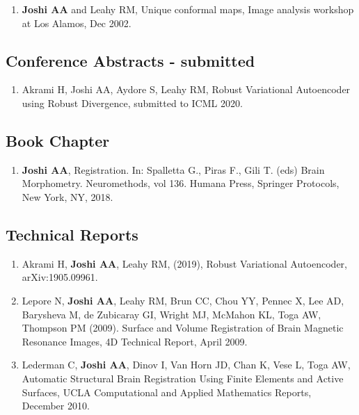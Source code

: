 \documentclass[overlapped,line,letterpaper]{res}
\begin{document}
\begin{resume}
\begin{enumerate}
    \item \textbf{Joshi AA} and Leahy RM, {Unique conformal maps},  Image analysis workshop at Los Alamos, Dec 2002. 
\end{enumerate}

\subsection{Conference Abstracts - submitted}
\begin{enumerate}
   \item Akrami H, Joshi AA, Aydore S, Leahy RM, {Robust Variational Autoencoder using Robust Divergence}, submitted to ICML 2020.
 
\end{enumerate}

\subsection{Book Chapter}
\begin{enumerate}
    \item \textbf{Joshi AA},  Registration. In: Spalletta G., Piras F., Gili T. (eds) Brain Morphometry. Neuromethods, vol 136. Humana Press, Springer Protocols, New York, NY, 2018.
\end{enumerate}


\subsection{Technical Reports}
\begin{enumerate}

    \item Akrami H, \textbf{Joshi AA}, Leahy RM, (2019), Robust Variational Autoencoder, arXiv:1905.09961.
    
    \item Lepore N, \textbf{Joshi AA}, Leahy RM, Brun CC, Chou YY, Pennec X, Lee AD, Barysheva M, de Zubicaray GI, Wright MJ, McMahon KL, Toga AW, Thompson PM (2009). Surface and Volume Registration of Brain Magnetic Resonance Images, 4D Technical Report, April 2009.

    \item Lederman C, \textbf{Joshi AA}, Dinov I, Van Horn JD, Chan K, Vese L, Toga AW, Automatic Structural Brain Registration Using Finite Elements and Active Surfaces, UCLA Computational and Applied Mathematics Reports, December 2010. 

\end{enumerate}



\end{resume}
\end{document}
